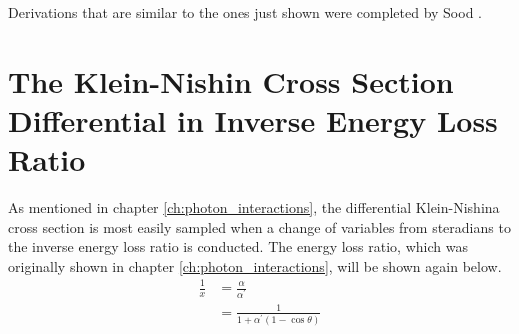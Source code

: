 Derivations that are similar to the ones just shown were completed by Sood
\citep{sood_doppler_2004}. 

\section{The Klein-Nishin Cross Section Differential in Inverse Energy Loss Ratio}
As mentioned in chapter \ref{ch:photon_interactions}, the differential 
Klein-Nishina cross section is most easily sampled when a change of variables
from steradians to the inverse energy loss ratio is conducted. The energy loss
ratio, which was originally shown in chapter \ref{ch:photon_interactions}, will
be shown again below.
\begin{align}
  \frac{1}{x} & = \frac{\alpha}{\alpha^{'}} \nonumber \\
  & = \frac{1}{1+\alpha^{'}(1-\cos{\theta})} \nonumber
\end{align}

